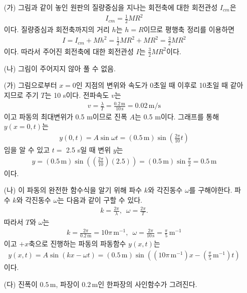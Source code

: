 \documentclass[floatfix,nofootinbib,superscriptaddress,fleqn]{revtex4-2}
\begin{document}
 

\vspace{0.5cm} 
\begin{itemize}
  \item[(가)]
  그림과 같이 놓인 원판의 질량중심을 지나는 회전축에 대한 회전관성 $I_{cm}$은
  \begin{align}
    I_{cm} = \frac{1}{2}MR^2
  \end{align}
  이다. 질량중심과 회전축까지의 거리 $h$는 $h=R$이므로
  평행축 정리를 이용하면
  \begin{align}
    I = I_{cm}+Mh^2=\frac{1}{2}MR^2 + MR^2 = \frac{3}{2}MR^2
  \end{align}
  이다. 따라서 주어진 회전축에 대한 회전관성 $I$는 $\frac{3}{2}MR^2$이다.
  \item[(나)] 
  그림이 주어지지 않아 풀 수 없음. 
\end{itemize}


\vspace{0.5cm} 
\begin{itemize}
  \item[(가)]
  그림으로부터 $ x=0$인 지점의 변위와 속도가 0초일 때 이후로 10초일 때 같아지므로 주기 $T$는 10 s이다.
  전파속도 $v$는 
  \begin{align}
    v = \frac{\lambda}{T} = \frac{0.2\,\mathrm{m}}{10\,\mathrm{s}}=0.02\,\mathrm{m/s}
  \end{align}
  이고 파동의 최대변위가 0.5 m이므로 진폭 $A$는 0.5 m이다. 그래프를 통해 $y(x=0,t)$는
  \begin{align}
    y(0,t) = A\sin\omega t = (0.5\,\mathrm{m})\sin\left(\frac{2\pi}{10}t\right)
  \end{align}
  임을 알 수 있고 $t=$ 2.5 s일 때 변위 $y$는
  \begin{align}
    y = (0.5\,\mathrm{m})\sin\left(\left(\frac{2\pi}{10}\right)(2.5)\right)
    =(0.5\,\mathrm{m})\sin\frac{\pi}{2} = 0.5\,\mathrm{m}
  \end{align}
  이다.
  \item[(나)]
  이 파동의 완전한 함수식을 알기 위해 파수 $k$와 각진동수 $\omega$를 구해야한다. 
  파수 $k$와 각진동수 $\omega$는 다음과 같이 구할 수 있다.
  \begin{align}
    k = \frac{2\pi}{\lambda},\,\,\, \omega = \frac{2\pi}{T}.
  \end{align}
  따라서 $T$와 $\omega$는
  \begin{align}
    k = \frac{2\pi}{0.2\,\mathrm{m}}=10\pi\,\mathrm{m^{-1}},\,\,\,
    \omega = \frac{2\pi}{10\,\mathrm{s}} = \frac{\pi}{5}\,\mathrm{m^{-1}}
  \end{align}
  이고 $+x$축으로 진행하는 파동의 파동함수 $y(x,t)$는
  \begin{align}
    y(x,t) = A\sin(kx-\omega t)
    = (0.5\,\mathrm{m})\sin\left((10\pi\,\mathrm{m^{-1}})x
    -(\frac{\pi}{5}\,\mathrm{m^{-1}}) t\right)
  \end{align}
  이다.
  \item[(다)]
  진폭이 $0.5\,\mathrm{m}$, 파장이 $0.2\,\mathrm{m}$인 한파장의 사인함수가 그려진다.
\end{itemize}
\vspace{0.5cm}
 
\end{document}

